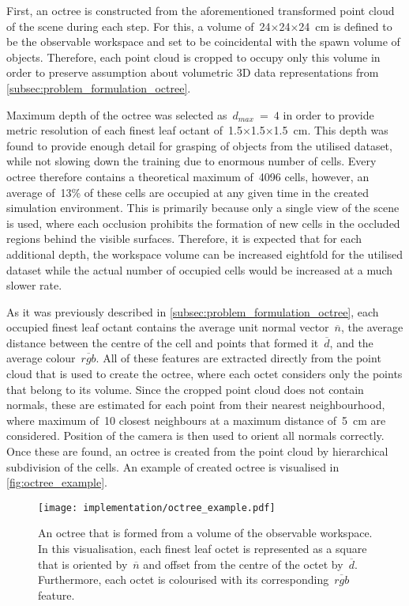 First, an octree is constructed from the aforementioned transformed point cloud of the scene during each step. For this, a volume of~24\({\times}\)24\({\times}\)24~cm is defined to be the observable workspace and set to be coincidental with the spawn volume of objects. Therefore, each point cloud is cropped to occupy only this volume in order to preserve assumption about volumetric 3D data representations from \autoref{subsec:problem_formulation_octree}.

Maximum depth of the octree was selected as~\(d_{max}\)~=~\(4\) in order to provide metric resolution of each finest leaf octant of~1.5\({\times}\)1.5\({\times}\)1.5~cm. This depth was found to provide enough detail for grasping of objects from the utilised dataset, while not slowing down the training due to enormous number of cells. Every octree therefore contains a theoretical maximum of~4096 cells, however, an average of~13\% of these cells are occupied at any given time in the created simulation environment. This is primarily because only a single view of the scene is used, where each occlusion prohibits the formation of new cells in the occluded regions behind the visible surfaces. Therefore, it is expected that for each additional depth, the workspace volume can be increased eightfold for the utilised dataset while the actual number of occupied cells would be increased at a much slower rate.

As it was previously described in \autoref{subsec:problem_formulation_octree}, each occupied finest leaf octant contains the average unit normal vector~\(\overline{n}\), the average distance between the centre of the cell and points that formed it~\(\overline{d}\), and the average colour~\(\overline{rgb}\). All of these features are extracted directly from the point cloud that is used to create the octree, where each octet considers only the points that belong to its volume. Since the cropped point cloud does not contain normals, these are estimated for each point from their nearest neighbourhood, where maximum of~10 closest neighbours at a maximum distance of~5~cm are considered. Position of the camera is then used to orient all normals correctly. Once these are found, an octree is created from the point cloud by hierarchical subdivision of the cells. An example of created octree is visualised in \autoref{fig:octree_example}.

\begin{figure}[ht]
    \centering
    \texttt{[image: implementation/octree\_example.pdf]}
    \caption{An octree that is formed from a volume of the observable workspace. In this visualisation, each finest leaf octet is represented as a square that is oriented by~\(\overline{n}\) and offset from the centre of the octet by~\(\overline{d}\). Furthermore, each octet is colourised with its corresponding~\(\overline{rgb}\) feature.}
    \label{fig:octree_example}
\end{figure}


